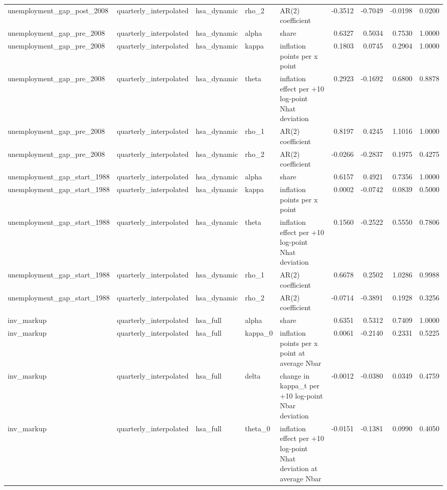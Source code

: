 \begin{tabular}{lllllrrrr}
unemployment\_gap\_post\_2008 & quarterly\_interpolated & hsa\_dynamic & rho\_2 & AR(2) coefficient & -0.3512 & -0.7049 & -0.0198 & 0.0200 \\
unemployment\_gap\_pre\_2008 & quarterly\_interpolated & hsa\_dynamic & alpha & share & 0.6327 & 0.5034 & 0.7530 & 1.0000 \\
unemployment\_gap\_pre\_2008 & quarterly\_interpolated & hsa\_dynamic & kappa & inflation points per x point & 0.1803 & 0.0745 & 0.2904 & 1.0000 \\
unemployment\_gap\_pre\_2008 & quarterly\_interpolated & hsa\_dynamic & theta & inflation effect per +10 log-point Nhat deviation & 0.2923 & -0.1692 & 0.6800 & 0.8878 \\
unemployment\_gap\_pre\_2008 & quarterly\_interpolated & hsa\_dynamic & rho\_1 & AR(2) coefficient & 0.8197 & 0.4245 & 1.1016 & 1.0000 \\
unemployment\_gap\_pre\_2008 & quarterly\_interpolated & hsa\_dynamic & rho\_2 & AR(2) coefficient & -0.0266 & -0.2837 & 0.1975 & 0.4275 \\
unemployment\_gap\_start\_1988 & quarterly\_interpolated & hsa\_dynamic & alpha & share & 0.6157 & 0.4921 & 0.7356 & 1.0000 \\
unemployment\_gap\_start\_1988 & quarterly\_interpolated & hsa\_dynamic & kappa & inflation points per x point & 0.0002 & -0.0742 & 0.0839 & 0.5000 \\
unemployment\_gap\_start\_1988 & quarterly\_interpolated & hsa\_dynamic & theta & inflation effect per +10 log-point Nhat deviation & 0.1560 & -0.2522 & 0.5550 & 0.7806 \\
unemployment\_gap\_start\_1988 & quarterly\_interpolated & hsa\_dynamic & rho\_1 & AR(2) coefficient & 0.6678 & 0.2502 & 1.0286 & 0.9988 \\
unemployment\_gap\_start\_1988 & quarterly\_interpolated & hsa\_dynamic & rho\_2 & AR(2) coefficient & -0.0714 & -0.3891 & 0.1928 & 0.3256 \\
inv\_markup & quarterly\_interpolated & hsa\_full & alpha & share & 0.6351 & 0.5312 & 0.7409 & 1.0000 \\
inv\_markup & quarterly\_interpolated & hsa\_full & kappa\_0 & inflation points per x point at average Nbar & 0.0061 & -0.2140 & 0.2331 & 0.5225 \\
inv\_markup & quarterly\_interpolated & hsa\_full & delta & change in kappa\_t per +10 log-point Nbar deviation & -0.0012 & -0.0380 & 0.0349 & 0.4759 \\
inv\_markup & quarterly\_interpolated & hsa\_full & theta\_0 & inflation effect per +10 log-point Nhat deviation at average Nbar & -0.0151 & -0.1381 & 0.0990 & 0.4050 \\

\end{tabular}
